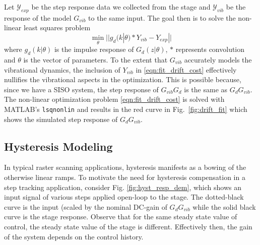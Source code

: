 \documentclass[journal,twocolumn,twoside]{IEEEtran}
\begin{document}
Let $\mathcal{Y}_{exp}$ be the step response data we collected from the stage and  $\mathcal{Y}_{vib}$ be the response of the model $G_{vib}$ to the same input. The goal then is to solve the non-linear least squares problem
\begin{equation}
  \min_{\theta}|| g_d(k|\theta)*Y_{vib} - Y_{exp}||
  \label{eqn:fit_drift_cost}
\end{equation}
where $g_d(k|\theta)$ is the impulse response of $G_d(z|\theta)$, $*$ represents convolution and  $\theta$ is the vector of parameters. To the extent that $G_{vib}$ accurately models the vibrational dynamics, the inclusion of $Y_{vib}$ in \eqref{eqn:fit_drift_cost} effectively nullifies the vibrational aspects in the optimization. This is possible because, since we have a SISO system, the step response of $G_{vib}G_d$ is the same as $G_dG_{vib}$.
The non-linear optimization problem \eqref{eqn:fit_drift_cost} is solved with MATLAB's \texttt{lsqnonlin} and results in the red curve in Fig.~\ref{fig:drift_fit} which shows the simulated step response of $G_dG_{vib}$. 


\subsection{Hysteresis Modeling}\label{sec:hyst_model}
In typical raster scanning applications, hysteresis manifests as a bowing of the otherwise linear ramps. To motivate the need for hysteresis compensation in a step tracking application, consider Fig. \ref{fig:hyst_resp_dem}, which shows an input signal of various steps applied open-loop to the stage. The dotted-black curve is the input (scaled by the nominal DC-gain of $G_dG_{vib}$ while the solid black curve is the stage response. Observe that for the same steady state value of control, the steady state value of the stage is different. Effectively then, the gain of the system depends on the control history.
\end{document}
